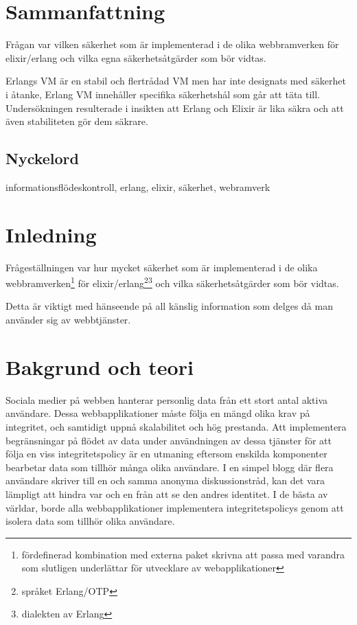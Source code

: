 \documentclass[12pt]{article}
\begin{document}
\maketitle

	 	 	 	 	
	
\section*{Sammanfattning}
Frågan var vilken säkerhet som är implementerad i de olika webbramverken för elixir/erlang och vilka egna säkerhetsåtgärder som bör vidtas.

Erlangs VM är en stabil och flertrådad VM men har inte designats med säkerhet i åtanke, Erlang VM innehåller specifika säkerhetshål som går att täta till.
Undersökningen resulterade i insikten att Erlang och Elixir är lika säkra och att även stabiliteten gör dem säkrare.
	
\subsection*{Nyckelord}
informationsflödeskontroll, erlang, elixir, säkerhet, webramverk
	
\section{Inledning}

Frågeställningen var hur mycket säkerhet som är implementerad i de olika webbramverken\footnote{fördefinerad kombination med externa paket skrivna att passa med varandra som slutligen underlättar för utvecklare av webapplikationer} för elixir/erlang\footnote{språket Erlang/OTP\cite{erlang}}\footnote{dialekten av Erlang\cite{elixir}} och vilka säkerhetsåtgärder som bör vidtas.

Detta är viktigt med hänseende på all känslig information som delges då man använder sig av webbtjänster.\\



 \section{Bakgrund och teori}


Sociala medier på webben hanterar personlig data från ett stort antal aktiva användare.
Dessa webbapplikationer måste följa en mängd olika krav på integritet, och samtidigt uppnå skalabilitet och hög prestanda.
Att implementera begränsningar på flödet av data under användningen av dessa tjänster för att följa en viss integritetspolicy är en utmaning eftersom enskilda komponenter bearbetar data som tillhör många olika användare.
I en simpel blogg där flera användare skriver till en och samma anonyma diskussionstråd, kan det vara lämpligt att hindra var och en från att se den andres identitet.
I de bästa av världar, borde alla webbapplikationer implementera integritetspolicys genom att isolera data som tillhör olika användare.\\
\end{document}
